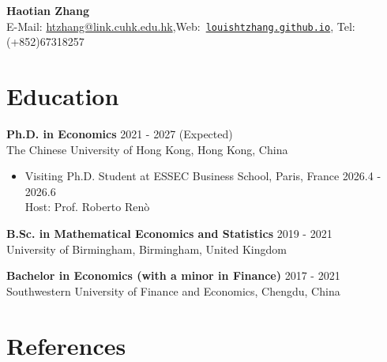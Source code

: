 \documentclass[12pt,a4paper]{article}
\begin{document}
\begin{center}
    {\LARGE \textbf{Haotian Zhang}} \\ \vspace{5pt}
    {\small E-Mail: \url{htzhang@link.cuhk.edu.hk},\enspace Web:~\href{https://louishtzhang.github.io/}{\nolinkurl{louishtzhang.github.io}}, \enspace Tel: (+852)67318257}
\end{center}

\vspace{10pt}

\section{Education}

\textbf{Ph.D. in Economics} \hfill 2021 - 2027 (Expected) \\
The Chinese University of Hong Kong, Hong Kong, China
\begin{itemize}[label=$\circ$, leftmargin=2.2em, itemsep=0.6em, topsep=0.3em]
    \item Visiting Ph.D. Student at ESSEC Business School, Paris, France \hfill 2026.4 - 2026.6\\[0.3em]
    Host: Prof. Roberto Renò
\end{itemize}
    

    \vspace{6pt}

\textbf{B.Sc. in Mathematical Economics and Statistics} \hfill 2019 - 2021 \\
University of Birmingham, Birmingham, United Kingdom

\vspace{6pt}

\textbf{Bachelor in Economics (with a minor in Finance)} \hfill 2017 - 2021 \\
Southwestern University of Finance and Economics, Chengdu, China

\section{References}
\end{document}
